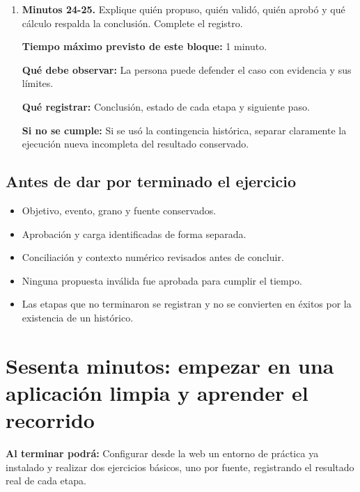 \begin{enumerate}
\begin{samepage}
{\small\textbf{Tiempo máximo previsto de este bloque:} 1 minuto.\par}
\textbf{Qué debe observar:} La persona puede defender el caso con evidencia y sus límites.

\textbf{Qué registrar:} Conclusión, estado de cada etapa y siguiente paso.

\textbf{Si no se cumple:} Si se usó la contingencia histórica, separar claramente la ejecución nueva incompleta del resultado conservado.

\end{samepage}
\else
\endgroup
\item \textbf{Minutos 24-25.} Explique quién propuso, quién validó, quién aprobó y qué cálculo respalda la conclusión. Complete el registro.

{\small\textbf{Tiempo máximo previsto de este bloque:} 1 minuto.\par}
\textbf{Qué debe observar:} La persona puede defender el caso con evidencia y sus límites.

\textbf{Qué registrar:} Conclusión, estado de cada etapa y siguiente paso.

\textbf{Si no se cumple:} Si se usó la contingencia histórica, separar claramente la ejecución nueva incompleta del resultado conservado.

\fi
\end{enumerate}
\subsection{Antes de dar por terminado el ejercicio}
\begin{itemize}
\item Objetivo, evento, grano y fuente conservados.
\item Aprobación y carga identificadas de forma separada.
\item Conciliación y contexto numérico revisados antes de concluir.
\item Ninguna propuesta inválida fue aprobada para cumplir el tiempo.
\item Las etapas que no terminaron se registran y no se convierten en éxitos por la existencia de un histórico.
\end{itemize}

\section{Sesenta minutos: empezar en una aplicación limpia y aprender el recorrido}
\textbf{Al terminar podrá:} Configurar desde la web un entorno de práctica ya instalado y realizar dos ejercicios básicos, uno por fuente, registrando el resultado real de cada etapa.

